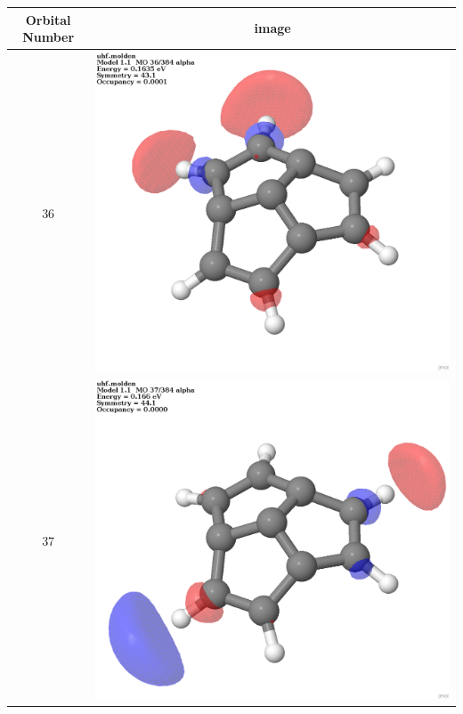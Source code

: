 \documentclass{article}
\begin{document}
\begin{tabular}{|c|c|}
\hline Orbital Number& image\\\hline
36 & \includegraphics[scale=0.1]{M1T_36.png}\\ \hline
37 & \includegraphics[scale=0.1]{M1T_37.png}\\ \hline

\end{tabular}
\end{document}
